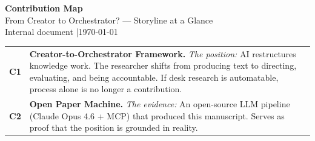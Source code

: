 \documentclass[11pt,a4paper]{article}
\newcommand{\ctag}[2]{\colorbox{#1}{\small\color{white}\textbf{#2}}}
\newcommand{\Cone}{\ctag{c1color}{C1}}
\newcommand{\Ctwo}{\ctag{c2color}{C2}}
\begin{document}
\begin{center}
{\LARGE\bfseries Contribution Map}\\[0.3em]
{\large From Creator to Orchestrator? --- Storyline at a Glance}\\[0.3em]
{\normalsize Internal document \quad|\quad \today}
\end{center}

\vspace{0.3em}

\begin{center}
\end{center}

\vspace{0.3em}

\noindent
\begin{tabularx}{\textwidth}{@{} c X @{}}
\Cone & \textbf{Creator-to-Orchestrator Framework.} \textit{The position:} AI restructures knowledge work. The researcher shifts from producing text to directing, evaluating, and being accountable. If desk research is automatable, process alone is no longer a contribution. \\[0.3em]
\Ctwo & \textbf{Open Paper Machine.} \textit{The evidence:} An open-source LLM pipeline (Claude Opus 4.6 + MCP) that produced this manuscript. Serves as proof that the position is grounded in reality. \\
\end{tabularx}

\vspace{0.2em}
\begin{center}
\end{center}
\end{document}
